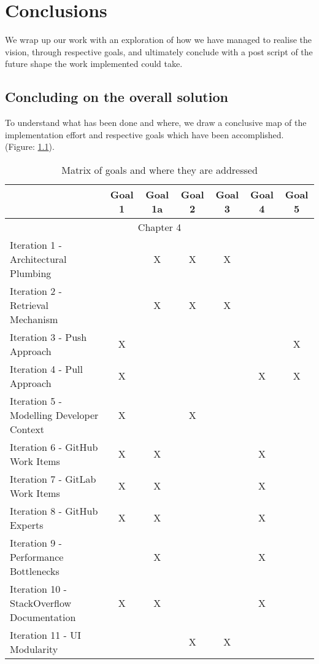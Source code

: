 \chapter{Conclusions}

We wrap up our work with an exploration of how we have managed to realise the vision, through respective goals, and ultimately conclude with a post script of the future shape the work implemented could take.

\section{Concluding on the overall solution}

To understand what has been done and where, we draw a conclusive map of the implementation effort and respective goals which have been accomplished. (Figure: \ref{table:matrixOfGoalsAndTheirImplementationEffort}). 

\begin{table}[h!]
\centering
\small
	\begin{tabular}{|p{6cm}|c|c|c|c|c|c|}
		\hline 
		& Goal 1 & Goal 1a & Goal 2 & Goal 3 & Goal 4 & Goal 5 \\ 
		\hline 
		\multicolumn{7}{|c|}{Chapter 4} \\ 
		\hline 
		Iteration 1 - Architectural Plumbing &  & X & X & X &  &  \\ 
		\hline 	
		Iteration 2 - Retrieval Mechanism &  & X & X & X &  &  \\ 
		\hline 	
		Iteration 3 - Push Approach & X &  &  &  &  & X \\ 
		\hline 
		Iteration 4 - Pull Approach & X &  &  &  & X & X \\ 
		\hline 
		Iteration 5 - Modelling Developer Context & X &  & X &  & &  \\ 
		\hline 
		Iteration 6 - GitHub Work Items & X & X &  &  & X &  \\ 
		\hline 
		Iteration 7 - GitLab Work Items & X & X &  &  & X &  \\ 
		\hline 
		Iteration 8 - GitHub Experts & X & X &  &  & X &  \\ 
		\hline 
		Iteration 9 - Performance Bottlenecks &  & X &  &  & X &  \\ 
		\hline 
		Iteration 10 - StackOverflow Documentation & X & X &  &  & X &  \\ 
		\hline 
		Iteration 11 - UI Modularity &  &  & X & X &  &  \\ 
		\hline 
	\end{tabular} 
	\caption{Matrix of goals and where they are addressed}
	\label{table:matrixOfGoalsAndTheirImplementationEffort}
\end{table}


